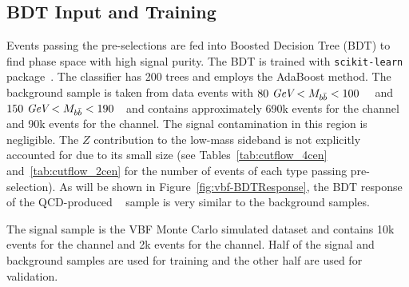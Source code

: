 \label{sec:vbf-bdt}

\subsection{BDT Input and Training}
Events passing the pre-selections are fed into Boosted Decision Tree (BDT) to find phase space with high signal purity.
The BDT is trained with \texttt{scikit-learn} package~\cite{scikit-learn}.
The classifier has 200 trees and employs the AdaBoost method.
The background sample is taken from data events with $80~\textit{GeV} < M_{b\bar{b}} <100$~\GeV~
and $150~\textit{GeV}<M_{b\bar{b}}<190$~\GeV~and contains approximately 690k events for
the \fourcentral channel and 90k events for the \twocentral channel.
The signal contamination in this region is negligible.
The $Z$ contribution to the low-mass sideband is not explicitly accounted
for due to its small size (see Tables~\ref{tab:cutflow_4cen}
and~\ref{tab:cutflow_2cen} for the number of events of each type passing pre-selection).
As will be shown in Figure~\ref{fig:vbf-BDTResponse},
the BDT response of the QCD-produced \zjets~ sample is very similar to the background samples. 

The signal sample is the VBF Monte Carlo simulated dataset and
contains 10k events for the \fourcentral channel and 2k events for
the \twocentral channel.  Half of the signal and background samples are
used for training and the other half are used for validation.

